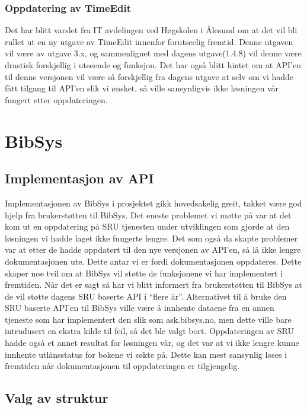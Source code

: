 \documentclass[../main.tex]{subfiles}
\begin{document}
\subsubsection{Oppdatering av TimeEdit}

Det har blitt varslet fra IT avdelingen ved Høgskolen i Ålesund om at det vil bli rullet ut en ny utgave av TimeEdit innenfor forutseelig fremtid. Denne utgaven vil være av utgave 3.x, og sammenlignet med dagens utgave(1.4.8) vil denne være drastisk forskjellig i utseende og funksjon. Det har også blitt hintet om at API’en til denne versjonen vil være så forskjellig fra dagens utgave at selv om vi hadde fått tilgang til API’en slik vi ønsket, så ville sansynligvis ikke løsningen vår fungert etter oppdateringen.

\section{BibSys}

\subsection{Implementasjon av API}

Implementasjonen av BibSys i prosjektet gikk hovedsakelig greit, takket være god hjelp fra brukerstøtten til BibSys. Det eneste problemet vi møtte på var at det kom ut en oppdatering på SRU tjenesten under utviklingen som gjorde at den løsningen vi hadde laget ikke fungerte lengre. Det som også da skapte problemer var at etter de hadde oppdatert til den nye versjonen av API’en, så lå ikke lengre dokumentasjonen ute. Dette antar vi er fordi dokumentasjonen oppdateres. Dette skaper noe tvil om at BibSys vil støtte de funksjonene vi har implementert i fremtiden. Når det er sagt så har vi blitt informert fra brukerstøtten til BibSys at de vil støtte dagens SRU baserte API i “flere år”.
Alternativet til å bruke den SRU baserte API’en til BibSys ville være å innhente dataene fra en annen tjeneste som har implementert den slik som ask.bibsys.no, men dette ville bare intrudusert en ekstra kilde til feil, så det ble valgt bort.\newline 
Oppdateringen av SRU hadde også et annet resultat for løsningen vår, og det var at vi ikke lengre kunne innhente utlånsstatus for bøkene vi søkte på. Dette kan mest sansynlig løses i fremtiden når dokumentasjonen til oppdateringen er tilgjengelig.

\subsection{Valg av struktur}
\end{document}
